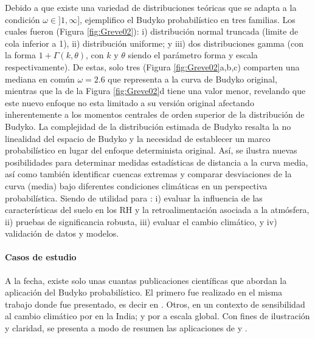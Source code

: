 \documentclass[12pt]{article}
\begin{document}
Debido a que existe una variedad de distribuciones teóricas que se adapta a la condición $\omega \in]1,\infty ]$, \citet{Greve2015} ejemplifico el Budyko probabilístico en tres familias. Los cuales fueron (Figura \ref{fig:Greve02}): i) distribución normal truncada (limite de cola inferior a 1), ii) distribución uniforme; y iii) dos distribuciones gamma (con la forma $1 + \Gamma (k, \theta )$, con $k$ y $\theta$ siendo el parámetro forma y escala respectivamente). De estas, solo tres (Figura \ref{fig:Greve02}a,b,c) comparten una mediana en común $\omega = 2.6$ que representa a la curva de Budyko original, mientras que la de la Figura \ref{fig:Greve02}d tiene una valor menor, revelando que este nuevo enfoque no esta limitado a su versión original afectando inherentemente a los momentos centrales de orden superior de la distribución de Budyko. La complejidad de la distribución estimada de Budyko resalta la no linealidad del espacio de Budyko y la necesidad de establecer un marco probabilístico en lugar del enfoque determinista original. Así, se ilustra nuevas posibilidades para determinar medidas estadísticas de distancia a la curva media, así como también identificar cuencas extremas y comparar desviaciones de la curva (media) bajo diferentes condiciones climáticas en un perspectiva probabilística. Siendo de utilidad para : i) evaluar la influencia de las características del suelo en los RH y la retroalimentación asociada a la atmósfera, ii) pruebas de significancia robusta, iii) evaluar el cambio climático, y iv) validación de datos y modelos.

\paragraph{Casos de estudio}\mbox{}

A la fecha, existe solo unas cuantas publicaciones científicas que abordan la aplicación del Budyko probabilístico. El primero fue realizado en el misma trabajo donde fue presentado, es decir en \citet{Greve2015}. Otros, en un contexto de sensibilidad al cambio climático por \cite{Singh2015} en la India; y por \citet{gudmundsson2016sensitivity} a escala global. Con fines de ilustración y claridad, se presenta a modo de resumen las aplicaciones de \citet{Greve2015} y \citet{Singh2015}.
\end{document}
